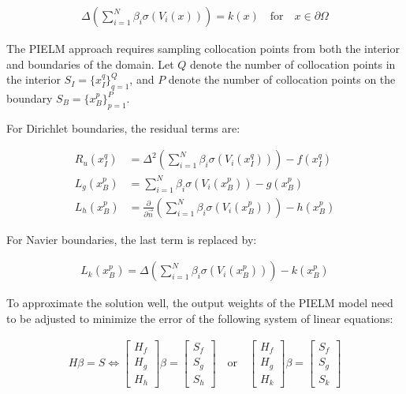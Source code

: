 \documentclass[11pt]{article}
\begin{document}
\begin{align}
    \Delta \left(\sum_{i=1}^{N} \beta_i \sigma(V_i(x))\right) = k(x) \quad \text{for} \quad x \in \partial\Omega
\end{align}

The PIELM approach requires sampling collocation points from both the interior and boundaries of the domain. Let $Q$ denote the number of collocation points in the interior $S_I = \{x_I^q\}_{q=1}^Q$, and $P$ denote the number of collocation points on the boundary $S_B = \{x_B^p\}_{p=1}^P$.

For Dirichlet boundaries, the residual terms are:

\begin{align}
    R_u(x_I^q) &= \Delta^2 \left(\sum_{i=1}^{N} \beta_i \sigma(V_i(x_I^q))\right) - f(x_I^q) \\
    L_g(x_B^p) &= \sum_{i=1}^{N} \beta_i \sigma(V_i(x_B^p)) - g(x_B^p) \\
    L_h(x_B^p) &= \frac{\partial}{\partial \vec{n}} \left(\sum_{i=1}^{N} \beta_i \sigma(V_i(x_B^p))\right) - h(x_B^p)
\end{align}

For Navier boundaries, the last term is replaced by:

\begin{align}
    L_k(x_B^p) = \Delta \left(\sum_{i=1}^{N} \beta_i \sigma(V_i(x_B^p))\right) - k(x_B^p)
\end{align}

To approximate the solution well, the output weights of the PIELM model need to be adjusted to minimize the error of the following system of linear equations:

\begin{align}
    H\beta = S \Leftrightarrow \begin{bmatrix} H_f \\ H_g \\ H_h \end{bmatrix} \beta = \begin{bmatrix} S_f \\ S_g \\ S_h \end{bmatrix} \quad \text{or} \quad \begin{bmatrix} H_f \\ H_g \\ H_k \end{bmatrix} \beta = \begin{bmatrix} S_f \\ S_g \\ S_k \end{bmatrix}
\end{align}
\end{document}
